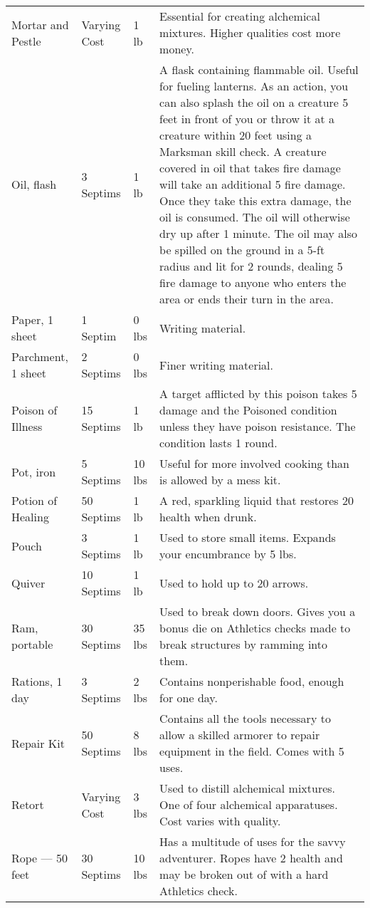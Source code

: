 {\begin{longtable}{p{}llp{}}
	Mortar and Pestle & Varying Cost & 1 lb & Essential for creating alchemical mixtures. Higher qualities cost more money.\\
	Oil, flash & 3 Septims & 1 lb & A flask containing flammable oil. Useful for fueling lanterns. As an action, you can also splash the oil on a creature 5 feet in front of you or throw it at a creature within 20 feet using a Marksman skill check. A creature covered in oil that takes fire damage will take an additional 5 fire damage. Once they take this extra damage, the oil is consumed. The oil will otherwise dry up after 1 minute. The oil may also be spilled on the ground in a 5-ft radius and lit for 2 rounds, dealing 5 fire damage to anyone who enters the area or ends their turn in the area.\\
	Paper, 1 sheet & 1 Septim & 0 lbs & Writing material.\\
	Parchment, 1 sheet & 2 Septims & 0 lbs & Finer writing material.\\
	Poison of Illness & 15 Septims & 1 lb & A target afflicted by this poison takes 5 damage and the Poisoned condition unless they have poison resistance. The condition lasts 1 round.\\
	Pot, iron & 5 Septims & 10 lbs & Useful for more involved cooking than is allowed by a mess kit.\\
	Potion of Healing & 50 Septims & 1 lb & A red, sparkling liquid that restores 20 health when drunk.\\
	Pouch & 3 Septims & 1 lb & Used to store small items. Expands your encumbrance by 5 lbs.\\
	Quiver & 10 Septims & 1 lb & Used to hold up to 20 arrows.\\
	Ram, portable & 30 Septims & 35 lbs & Used to break down doors. Gives you a bonus die on Athletics checks made to break structures by ramming into them.\\
	Rations, 1 day & 3 Septims & 2 lbs & Contains nonperishable food, enough for one day.\\
	Repair Kit & 50 Septims & 8 lbs & Contains all the tools necessary to allow a skilled armorer to repair equipment in the field. Comes with 5 uses.\\
	Retort & Varying Cost & 3 lbs & Used to distill alchemical mixtures. One of four alchemical apparatuses. Cost varies with quality.\\
	Rope --- 50 feet & 30 Septims & 10 lbs & Has a multitude of uses for the savvy adventurer. Ropes have 2 health and may be broken out of with a hard Athletics check.\\

\end{longtable}}
